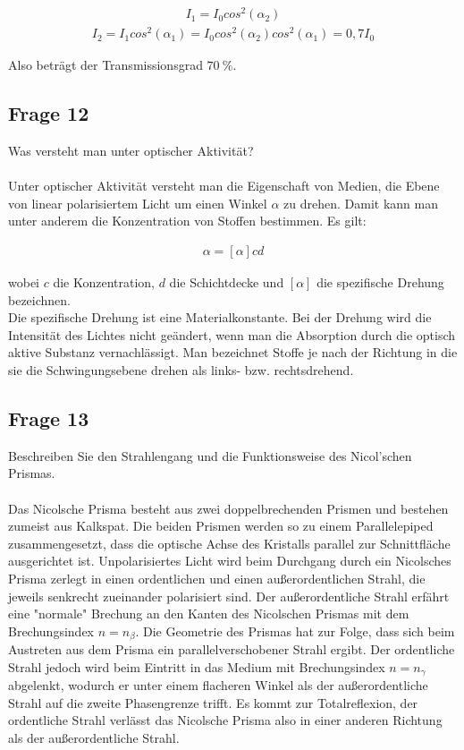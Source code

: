 \documentclass[a4paper,10pt]{scrartcl}
\begin{document}
	    	\begin{align*}
	    	I_{1}=I_{0}cos^{2}(\alpha_{2})
	    	\end{align*}
	    	\begin{align*}
	    	I_{2}=I_{1}cos^{2}(\alpha_{1})=I_{0}cos^{2}(\alpha_{2})cos^{2}(\alpha_{1})=0,7I_{0}
	    	\end{align*}
	    	
	    	Also beträgt der Transmissionsgrad \(\SI{70}{\percent}\).
	    	
	    \subsection{Frage 12}
	    	Was versteht man unter optischer Aktivität?\\
	    	\\
	    	Unter optischer Aktivität versteht man die Eigenschaft von Medien, die Ebene von linear polarisiertem Licht um einen Winkel \(\alpha\) zu drehen. Damit kann man unter anderem die Konzentration von Stoffen bestimmen. Es gilt:
	    	
	    	\begin{align*}
	    	\alpha=[\alpha]cd
	    	\end{align*} 
	    	
	    	wobei \(c\) die Konzentration, \(d\) die Schichtdecke und \([\alpha]\) die spezifische Drehung bezeichnen.\\ Die spezifische Drehung ist eine Materialkonstante. Bei der Drehung wird die Intensität des Lichtes nicht geändert, wenn man die Absorption durch die optisch aktive Substanz vernachlässigt. Man bezeichnet Stoffe je nach der Richtung in die sie die Schwingungsebene drehen als links- bzw. rechtsdrehend.
	    	
	    \subsection{Frage 13}
	    	Beschreiben Sie den Strahlengang und die Funktionsweise des Nicol’schen
	    	Prismas.\\
	    	\\
	    	Das Nicolsche Prisma besteht aus zwei doppelbrechenden Prismen und bestehen zumeist aus Kalkspat. Die beiden Prismen werden so zu einem Parallelepiped zusammengesetzt, dass die optische Achse des Kristalls parallel zur Schnittfläche ausgerichtet ist.
	    	Unpolarisiertes Licht wird beim Durchgang durch ein Nicolsches Prisma zerlegt in einen ordentlichen und einen außerordentlichen Strahl, die jeweils senkrecht zueinander polarisiert sind. Der außerordentliche Strahl erfährt eine "normale" Brechung an den Kanten des Nicolschen Prismas mit dem Brechungsindex \(n=n_{\beta}\). Die Geometrie des Prismas hat zur Folge, dass sich beim Austreten aus dem Prisma ein parallelverschobener Strahl ergibt. Der ordentliche Strahl jedoch wird beim Eintritt in das Medium mit Brechungsindex \(n=n_{\gamma}\) abgelenkt, wodurch er unter einem flacheren Winkel als der außerordentliche Strahl auf die zweite Phasengrenze trifft. Es kommt zur Totalreflexion, der ordentliche Strahl verlässt das Nicolsche Prisma also in einer anderen Richtung als der außerordentliche Strahl.
	    	
\end{document}
